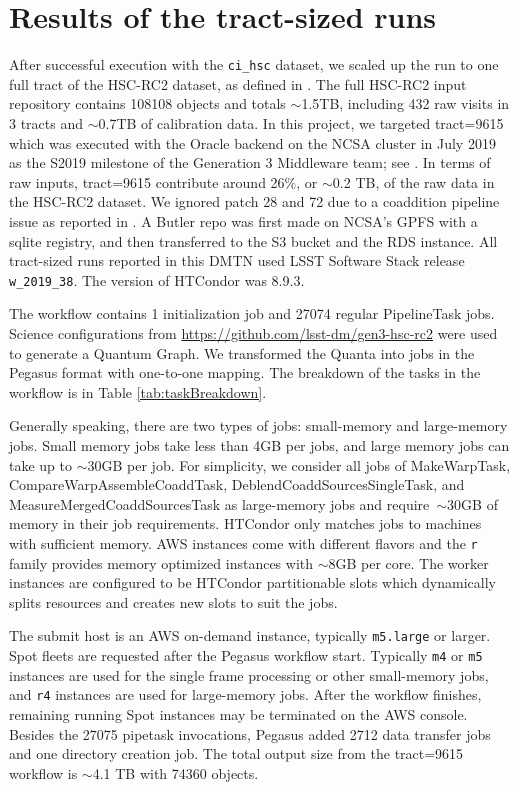 \section{Results of the tract-sized runs}

After successful execution with the \texttt{ci\_hsc} dataset, we scaled up the run to one full tract of the HSC-RC2 dataset, as defined in .
The full HSC-RC2 input repository contains 108108 objects and totals $\sim$1.5TB, including 432 raw visits in 3 tracts and $\sim$0.7TB of calibration data.
In this project, we targeted tract=9615 which was executed with the Oracle backend on the NCSA cluster in July 2019 as the S2019 milestone of the Generation 3 Middleware team; see .
In terms of raw inputs, tract=9615 contribute around 26$\%$, or $\sim$0.2 TB, of the raw data in the HSC-RC2 dataset.
We ignored patch 28 and 72 due to a coaddition pipeline issue as reported in .
A Butler repo was first made on NCSA's GPFS with a sqlite registry, and then transferred to the S3 bucket and the RDS instance.
All tract-sized runs reported in this DMTN used LSST Software Stack release \texttt{w\_2019\_38}.
The version of HTCondor was 8.9.3.

The workflow contains 1 initialization job and 27074 regular PipelineTask jobs.
Science configurations from \url{https://github.com/lsst-dm/gen3-hsc-rc2} were used to generate a Quantum Graph.
We transformed the Quanta into jobs in the Pegasus format with one-to-one mapping.
The breakdown of the tasks in the workflow is in Table \ref{tab:taskBreakdown}.



Generally speaking, there are two types of jobs: small-memory and large-memory jobs.
Small memory jobs take less than 4GB per jobs, and large memory jobs can take up to $\sim$30GB per job.
For simplicity, we consider all jobs of MakeWarpTask, CompareWarpAssembleCoaddTask, DeblendCoaddSourcesSingleTask, and MeasureMergedCoaddSourcesTask as large-memory jobs and require~$\sim$30GB of memory in their job requirements.
HTCondor only matches jobs to machines with sufficient memory.
AWS instances come with different flavors and the \texttt{r} family provides memory optimized instances with $\sim$8GB per core.
The worker instances are configured to be HTCondor partitionable slots which dynamically splits resources and creates new slots to suit the jobs.

The submit host is an AWS on-demand instance, typically \texttt{m5.large} or larger.
Spot fleets are requested after the Pegasus workflow start.
Typically \texttt{m4} or \texttt{m5} instances are used for the single frame processing or other small-memory jobs, and \texttt{r4} instances are used for large-memory jobs.
After the workflow finishes, remaining running Spot instances may be terminated on the AWS console.
Besides the 27075 pipetask invocations, Pegasus added 2712 data transfer jobs and one directory creation job.
The total output size from the tract=9615 workflow is $\sim$4.1 TB with 74360 objects.

